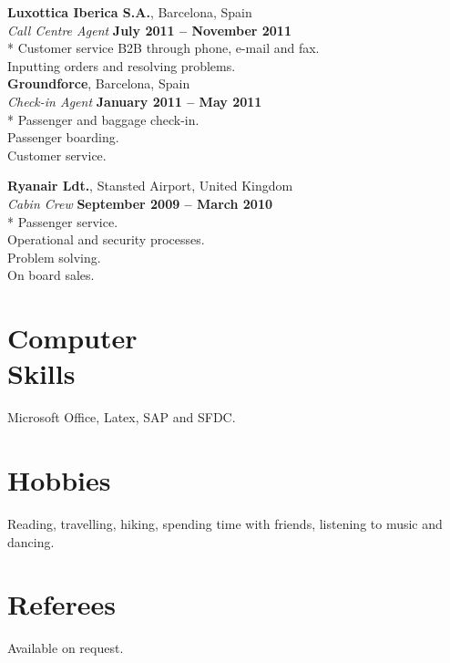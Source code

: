 \documentclass[margin,line]{resume}
\begin{document}
\begin{resume}
    \textbf{Luxottica Iberica S.A.}, Barcelona, Spain \vspace{2mm}\\\vspace{1mm}%
    \textsl{Call Centre Agent} \hfill \textbf{July 2011 -- November 2011}\\*
    Customer service B2B through phone, e-mail and fax. \vspace{1mm}\\%
    Inputting orders and resolving problems. \vspace{1mm}\\%

    \textbf{Groundforce}, Barcelona, Spain \vspace{2mm}\\\vspace{1mm}%
    \textsl{Check-in Agent} \hfill \textbf{January 2011 -- May 2011}\\*
    Passenger and baggage check-in. \vspace{1mm}\\%
    Passenger boarding. \vspace{1mm}\\%
    Customer service. \vspace{1mm}\\%
    \clearpage

    \textbf{Ryanair Ldt.}, Stansted Airport, United Kingdom \vspace{2mm}\\\vspace{1mm}%
    \textsl{Cabin Crew} \hfill \textbf{September 2009 -- March 2010}\\*
    Passenger service. \vspace{1mm}\\%
    Operational and security processes. \vspace{1mm}\\%
    Problem solving. \vspace{1mm}\\%
    On board sales. \vspace{1mm}\\%
    
 
    \section{\mysidestyle Computer \\Skills}
    Microsoft Office, Latex, SAP and SFDC. 
    
    \section{\mysidestyle Hobbies}
    Reading, travelling, hiking, spending time with friends, listening to music and dancing.

    \section{\mysidestyle Referees} 
    Available on request.
    


\end{resume}
\end{document}
